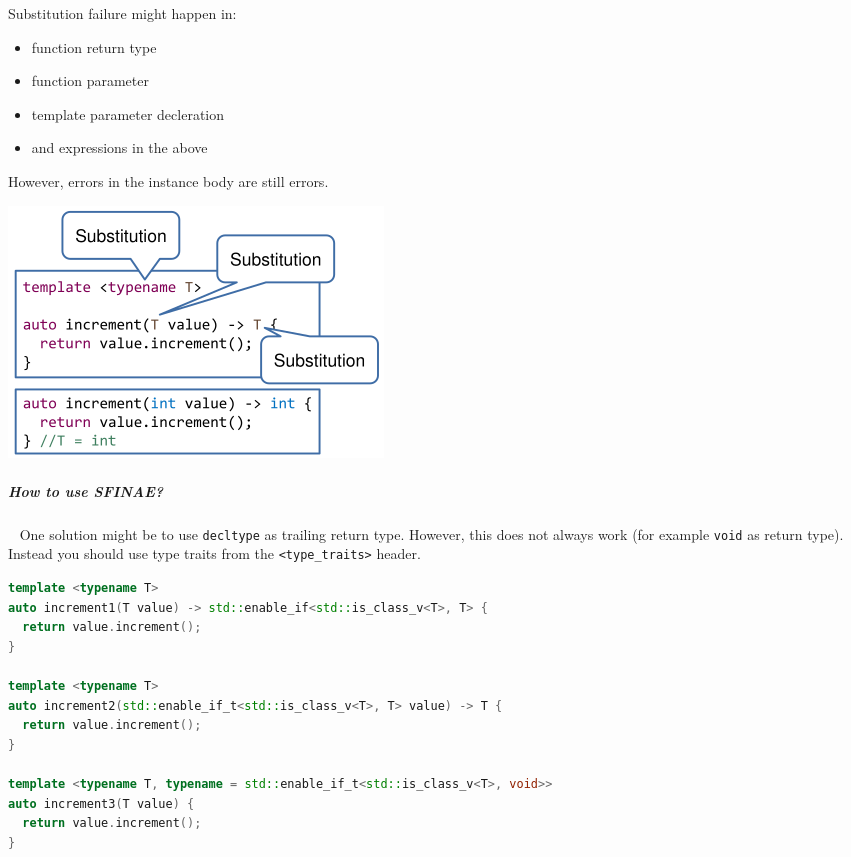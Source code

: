 \documentclass[11pt,twoside,landscape]{article}
\begin{document}
\begin{multicols}{2}
Substitution failure might happen in:
\begin{itemize}
\item function return type
\item function parameter
\item template parameter decleration
\item and expressions in the above
\end{itemize}


However, errors in the instance body are still errors.


{
\begin{center}
\includegraphics[width=.9\linewidth]{img/sfinae_locations.png}
\end{center}
\label{fig:positions-for-substituion}
}
\subparagraph{How to use SFINAE?} \
\label{sec:orge2ccfdb}
One solution might be to use \texttt{decltype} as trailing return type.
However, this does not always work (for example \texttt{void} as return type).
Instead you should use type traits from the \texttt{<type\_traits>} header.

\begin{lstlisting}[language=c++,label=lst:orgbb42b2f,caption={Example useage for SFINAE},captionpos=b,numbers=none]
template <typename T>
auto increment1(T value) -> std::enable_if<std::is_class_v<T>, T> {
  return value.increment();
}

template <typename T>
auto increment2(std::enable_if_t<std::is_class_v<T>, T> value) -> T {
  return value.increment();
}

template <typename T, typename = std::enable_if_t<std::is_class_v<T>, void>>
auto increment3(T value) {
  return value.increment();
}

\end{lstlisting}


\end{multicols}
\end{document}
